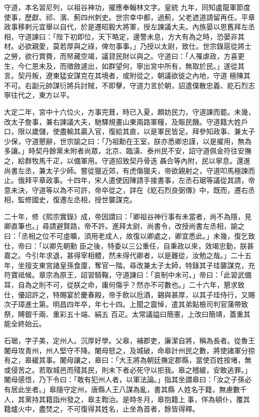 \begin{pinyinscope}
 守道，本名習尼列，以祖谷神功，擢應奉翰林文字。皇統
 九年，同知盧龍軍節度使事，歷獻、祁、濱、薊四州刺史。世宗幸中都，過薊，父老遮道請留再任。平章政事移剌元宜舉以自代，於是遷昭毅大將軍，授左諫議大夫。內族晏以恩舊拜左丞相，守道諫曰：「陛下初即位，天下略定，邊警未息，方大有為之時，恐晏非其材。必欲親愛，莫若厚與之祿，俾勿事事。」乃授以太尉，致仕。世宗錄扈從將士之勞，欲行賞賚，而帑藏空竭，議貸民財以與之。守道曰：「人罹虐政，方喜更生，今仁恩未及，而徵斂遽出，如群望何，寧出宮中所有，無取於民。」遂從其言。契丹叛，遼東猛安謀克在其境者，或附從之，朝議欲徙之內地，守道
 極陳其不可。右副元帥謀衍將兵討賊，不即擊，守道力言於朝，詔遣僕散忠義、紇石烈志寧往代之，東方以平。



 大定二年，宮中十六位火，方事完葺，時已入夏，頗妨民力，守道諫而罷。未幾，改太子詹事，兼右諫議大夫，馳驛規畫山東兩路軍糧，及賑民饑。守道籍大姓戶口，限以歲儲，使盡輸其贏入官，復給其直，以是軍民皆足。拜參知政事、兼太子少保，守道懇辭，世宗諭之曰：「乃祖勳在王室，朕亦悉卿忠謹，以是擢用，無為多讓。」時契丹餘黨未附者尚眾，北京、臨潢、泰州民不安，詔守道佩金符往安撫之，給群牧馬千疋，以備軍用。守道招致契丹骨迭
 聶合等內附，民以寧息。還進尚書左丞，兼太子少師。嘗從獵近郊，有虎傷獵夫，帝欲親射之，守道叩馬極諫而止。俄拜平章政事。十四年，宋人遣使因陳請手接書事，左丞石琚等議從其請，帝意未決，守道等以為不可許，帝卒從之，詳在《紇石烈良弼傳》中，既而，遷右丞相，監修國史，復遷左丞相，授世襲謀克。



 二十年，修《熙宗實錄》成，帝因謂曰：「卿祖谷神行事有未當者，尚不為隱，見卿直筆也。」尋請避賢路，帝不許。進拜太尉、尚書令，改授尚書左丞相，諭之曰：「丞相之位不可虛曠，須用老成人，故復以卿處之，卿宜悉此。」未幾，復乞致仕，帝曰：「以卿先朝勳
 臣之後，特委以三公重任，自秉政以來，效竭忠勤，朕甚嘉之。今引年求退，甚得宰相體，然未得代卿者，以是難從，汝勉之哉。」二十五年，坐擅支東宮諸皇孫食廩，奪官一階。尋改兼太子太師，特錄其子珪襲謀克，充符寶祗候。章宗為原王，詔習騎鞠，守道諫曰：「哀制中未可。」帝曰：「此習武備耳，自為之則不可，從朕之命，庸何傷乎？然亦不可數也。」二十六年，懇求致仕，優詔許之，特賜宴於慶春殿，帝手飲以卮酒，錫與甚厚，以其子珪侍行，又賜次子璋進士第。明昌四年卒，年七十四。上聞之震悼，遣其弟點檢司判官蒲帶致祭，賻銀千兩、重彩五十端、絹五
 百疋。太常議謚曰簡憲，上改曰簡靖，蓋重其能全終始云。



 石琚，字子美，定州人。沉厚好學。父皋，補郡吏，廉潔自將，稱為長者。從魯王闍母攻青州，州人堅守不降。闍母怒之，及城破，命皋計州民之數，將使諸軍分掠有之，皋緩其事。闍母讓之，皋曰：「大王將為朝廷撫定郡縣，當使百姓按堵，無或侵苦之。若取城邑而殘其民，則未下者必死守以拒我。皋之稽緩，安敢逃罪。」闍母感悟，乃下令曰：「敢有犯州人者，以軍法論。」指其坐謂皋曰：「汝之子孫必有居此坐者。」皋隨守定州，唐縣人王八謀為亂，書其縣
 人姓名于籍，無慮數千人，其黨持其籍詣州發之，皋主鞫治。是時冬月，皋抱籍上事，佯為頓仆，覆其籍爐火中，盡焚之，不可復得其姓名，止坐為首者，餘皆得釋。




\end{pinyinscope}
